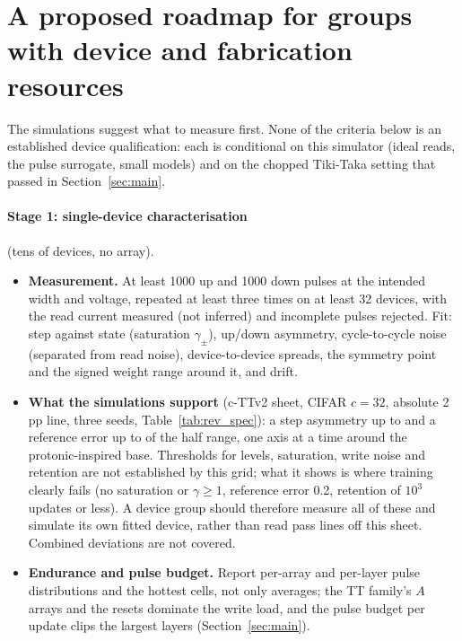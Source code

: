 \section{A proposed roadmap for groups with device and fabrication resources}\label{sec:roadmap}
The simulations suggest what to measure first. None of the criteria below is an established device qualification: each is
conditional on this simulator (ideal reads, the pulse surrogate, small models) and on the chopped Tiki-Taka setting that passed
in Section~\ref{sec:main}.

\paragraph{Stage 1: single-device characterisation} (tens of devices, no array).
\begin{itemize}
\item \textbf{Measurement.} At least 1000 up and 1000 down pulses at the intended width and voltage, repeated at least three
      times on at least 32 devices, with the read current measured (not inferred) and incomplete pulses rejected. Fit: step
      against state (saturation $\gamma_\pm$), up/down asymmetry, cycle-to-cycle noise (separated from read noise),
      device-to-device spreads, the symmetry point and the signed weight range around it, and drift.
\item \textbf{What the simulations support} (c-TTv2 sheet, CIFAR $c=32$, absolute 2\,pp line, three seeds,
      Table~\ref{tab:rev_spec}): a step asymmetry up to \RVSpecCttvTwoCifarAsymThr{} and a reference error up to
      \RVSpecCttvTwoCifarRefErrThr{} of the half range, one axis at a time around the protonic-inspired base. Thresholds for
      levels, saturation, write noise and retention are not established by this grid; what it shows is where training clearly
      fails (no saturation or $\gamma\ge1$, reference error 0.2, retention of $10^3$ updates or less). A device group should
      therefore measure all of these and simulate its own fitted device, rather than read pass lines off this sheet. Combined
      deviations are not covered.
\item \textbf{Endurance and pulse budget.} Report per-array and per-layer pulse distributions and the hottest cells, not only
      averages; the TT family's $A$ arrays and the resets dominate the write load, and the pulse budget per update clips the
      largest layers (Section~\ref{sec:main}).
\end{itemize}

